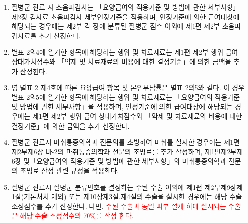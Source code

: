 \begin{enumerate}[1.]
\item 질병군 진료 시 초음파검사는 「요양급여의 적용기준 및 방법에 관한
세부사항」 제2장 검사료 초음파검사 세부인정기준을 적용하며, 인정기준에
의한 급여대상에 해당되는 경우에는 제2부 각 장에 분류된 질병군 점수
이외에 제1편 제2부 초음파검사료를 추가 산정한다.
\item 별표 2의4에 열거한 항목에 해당하는 행위 및 치료재료는 제1편 제2부
행위 급여 상대가치점수와 「약제 및 치료재료의 비용에 대한 결정기준」에
의한 금액을 추가 산정한다.
\item 영 별표 2 제4호에 따른 요양급여 항목 및 본인부담률은 별표 2의5와 같다.
이 경우 별표 2의5에 열거한 항목에 해당하는 행위 및 치료재료는
「요양급여의 적용기준 및 방법에 관한 세부사항」을 적용하며, 인정기준에
의한 급여대상에 해당되는 경우에는 제1편 제2부 행위 급여 상대가치점수와
「약제 및 치료재료의 비용에 대한 결정기준」에 의한 금액을 추가 산정한다.	
\item 질병군 진료시 마취통증의학과 전문의를 초빙하여 마취를 실시한
경우에는 제1편제2부제6장 바-2의 마취통증의학과 전문의 초빙료를
추가 산정하며, 제1편제2부제6장 및「요양급여의 적용기준 및 방법에
관한 세부사항」의 마취통증의학과 전문의 초빙료 산정 관련 규정을
적용한다.
\item 질병군 진료시 질병군 분류번호를 결정하는 주된 수술 이외에 제1편
제2부제9장제1절(기본처치 제외) 또는 제10장제3절.제4절의 수술을
실시한 경우에는 해당 수술 소정점수를 추가 산정한다. 다만, \textcolor{red}{주된 수술과
동일 피부 절개 하에 실시되는 수술은 해당 수술 소정점수의 70\%를 산정
한다.}
\end{enumerate}
